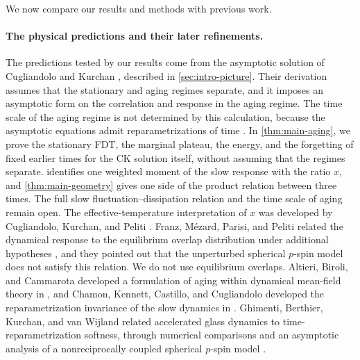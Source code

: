 We now compare our results and methods with previous work.

\paragraph{The physical predictions and their later refinements.}
The predictions tested by our results come from the asymptotic solution of Cugliandolo and Kurchan \cite{ck1993}, described in \cref{sec:intro-picture}. Their derivation assumes that the stationary and aging regimes separate, and it imposes an asymptotic form on the correlation and response in the aging regime. The time scale of the aging regime is not determined by this calculation, because the asymptotic equations admit reparametrizations of time \cite[arXiv version~1, Section~4]{ck1994}. In \cref{thm:main-aging}, we prove the stationary FDT, the marginal plateau, the energy, and the forgetting of fixed earlier times for the CK solution itself, without assuming that the regimes separate.  identifies one weighted moment of the slow response with the ratio $x$, and \cref{thm:main-geometry} gives one side of the product relation between three times. The full slow fluctuation--dissipation relation and the time scale of aging remain open. The effective-temperature interpretation of $x$ was developed by Cugliandolo, Kurchan, and Peliti \cite{ckp1997}. Franz, M\'ezard, Parisi, and Peliti related the dynamical response to the equilibrium overlap distribution under additional hypotheses \cite{fmpp1998}, and they pointed out that the unperturbed spherical $p$-spin model does not satisfy this relation. We do not use equilibrium overlaps. Altieri, Biroli, and Cammarota developed a formulation of aging within dynamical mean-field theory in \cite{altieri2020}, and Chamon, Kennett, Castillo, and Cugliandolo developed the reparametrization invariance of the slow dynamics in \cite{chamon2002}. Ghimenti, Berthier, Kurchan, and van Wijland related accelerated glass dynamics to time-reparametrization softness, through numerical comparisons and an asymptotic analysis of a nonreciprocally coupled spherical $p$-spin model \cite[pp.~4--5 and SI Appendix, Section~7]{ghimenti2026}.

